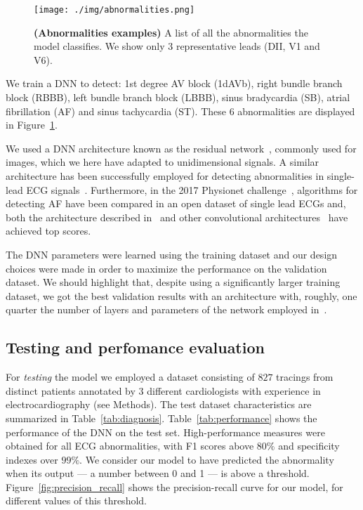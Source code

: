 \documentclass{article}
\begin{document}
\begin{figure}[htpb]
    \centering
    \texttt{[image: ./img/abnormalities.png]}
    \caption{\textbf{(Abnormalities examples)} A list of all the abnormalities the model classifies. We show only 3 representative leads (DII, V1 and V6).}
    \label{fig:abnormalities}
\end{figure}

We train a DNN to detect: 1st degree AV block (1dAVb), right bundle branch block (RBBB), left bundle branch block (LBBB), sinus bradycardia (SB), atrial fibrillation (AF) and sinus tachycardia (ST). These 6 abnormalities are displayed in Figure~\ref{fig:abnormalities}.


We used a DNN architecture known as the residual network~\cite{he_deep_2016}, commonly used for images, which we here have adapted to unidimensional signals. A similar architecture has been successfully employed for detecting abnormalities in single-lead ECG signals~\cite{hannun_cardiologistlevel_2019}. Furthermore, in the  2017 Physionet challenge~\cite{clifford_af_2017}, algorithms for detecting AF have been compared in an open dataset of single lead ECGs and, both the architecture described in~\cite{hannun_cardiologistlevel_2019} and other convolutional architectures~\cite{hong_encase_2017, kamaleswaran_robust_2018} have achieved top scores.

The DNN parameters were learned using the training dataset and our design choices were made in order to maximize the performance on the validation dataset. We should highlight that, despite using a significantly larger training dataset, we got the best validation results with an architecture with, roughly, one quarter the number of layers and parameters of the network employed in~\cite{hannun_cardiologistlevel_2019}.

\subsection{Testing and perfomance evaluation}
For \textit{testing} the model we employed a dataset consisting of $827$ tracings from distinct patients annotated by 3 different cardiologists with experience in electrocardiography (see Methods). The test dataset characteristics are summarized in Table~\ref{tab:diagnosis}. Table~\ref{tab:performance} shows the performance of the DNN on the test set.  High-performance measures were obtained for all ECG abnormalities, with F1 scores above $80\%$ and specificity indexes over $99\%$.  We consider our model to have predicted the abnormality when its output --- a number between 0 and 1 --- is above a threshold. Figure~\ref{fig:precision_recall} shows the precision-recall curve for our model, for different values of this threshold. 
\end{document}
